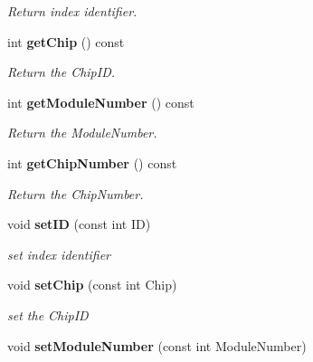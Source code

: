 \begin{DoxyCompactItemize}
\begin{DoxyCompactList}\small\item\em Return index identifier. \item\end{DoxyCompactList}\item 
int {\bf getChip} () const \label{classCALICE_1_1Ahc2HardwareConnection_ab7f74ef16dfe7b6a25e2c56230d0c6fc}

\begin{DoxyCompactList}\small\item\em Return the ChipID. \item\end{DoxyCompactList}\item 
int {\bf getModuleNumber} () const \label{classCALICE_1_1Ahc2HardwareConnection_af217512dbc7bf71d2c128a9935532294}

\begin{DoxyCompactList}\small\item\em Return the ModuleNumber. \item\end{DoxyCompactList}\item 
int {\bf getChipNumber} () const \label{classCALICE_1_1Ahc2HardwareConnection_a64b7b4c23e8d862a1d0967186022785b}

\begin{DoxyCompactList}\small\item\em Return the ChipNumber. \item\end{DoxyCompactList}\item 
void {\bf setID} (const int ID)\label{classCALICE_1_1Ahc2HardwareConnection_a8cf88bd1e291534c8b73a37a707e9631}

\begin{DoxyCompactList}\small\item\em set index identifier \item\end{DoxyCompactList}\item 
void {\bf setChip} (const int Chip)\label{classCALICE_1_1Ahc2HardwareConnection_a2e3f3b9483c6564db3451cdcb0caaf88}

\begin{DoxyCompactList}\small\item\em set the ChipID \item\end{DoxyCompactList}\item 
void {\bf setModuleNumber} (const int ModuleNumber)\label{classCALICE_1_1Ahc2HardwareConnection_a65292ca8879275abf37f19fb16fd198a}


\end{DoxyCompactItemize}

